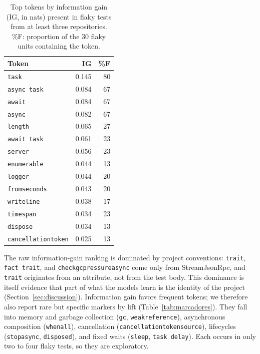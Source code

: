 \begin{table}[!h]
\caption{Top tokens by information gain (IG, in nats) present in flaky tests from at least three repositories. \%F: proportion of the 30 flaky units containing the token.}
\label{tab:tokens}
\centering
\footnotesize
\setlength{\tabcolsep}{12pt}
\begin{tabular}{@{}lrr@{}}
\toprule
\textbf{Token} & \textbf{IG} & \textbf{\%F} \\
\midrule
\texttt{task}              & 0.145 & 80 \\
\texttt{async task}        & 0.084 & 67 \\
\texttt{await}             & 0.084 & 67 \\
\texttt{async}             & 0.082 & 67 \\
\texttt{length}            & 0.065 & 27 \\
\texttt{await task}        & 0.061 & 23 \\
\texttt{server}            & 0.056 & 23 \\
\texttt{enumerable}        & 0.044 & 13 \\
\texttt{logger}            & 0.044 & 20 \\
\texttt{fromseconds}       & 0.043 & 20 \\
\texttt{writeline}         & 0.038 & 17 \\
\texttt{timespan}          & 0.034 & 23 \\
\texttt{dispose}           & 0.034 & 13 \\
\texttt{cancellationtoken} & 0.025 & 13 \\
\bottomrule
\end{tabular}
\end{table}

The raw information-gain ranking is dominated by project conventions: \texttt{trait}, \texttt{fact trait}, and \texttt{checkgcpressureasync} come only from StreamJsonRpc, and \texttt{trait} originates from an attribute, not from the test body. This dominance is itself evidence that part of what the models learn is the identity of the project (Section~\ref{sec:discussion}). Information gain favors frequent tokens; we therefore also report rare but specific markers by lift (Table~\ref{tab:marcadores}). They fall into memory and garbage collection (\texttt{gc}, \texttt{weakreference}), asynchronous composition (\texttt{whenall}), cancellation (\texttt{cancellationtokensource}), lifecycles (\texttt{stopasync}, \texttt{disposed}), and fixed waits (\texttt{sleep}, \texttt{task delay}). Each occurs in only two to four flaky tests, so they are exploratory. 

